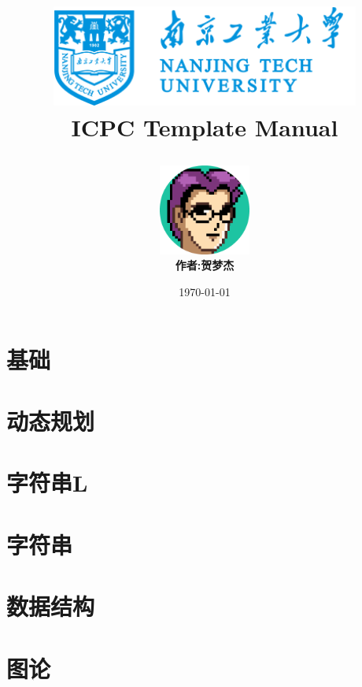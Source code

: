 \documentclass[10pt,a4paper,oneside]{book}
\title{
    \begin{center}
        \includegraphics[width=4in]{logo.png}
        \\ 
        \textbf{ICPC Template Manual}
    \end{center}
}
\author{
    \includegraphics[width=3cm]{author.png}
    \\
    \textbf{作者:贺梦杰}
}
\date{\today}
\begin{document}
    \maketitle
    \tableofcontents

    \chapter{基础}
    


    \chapter{动态规划}
    
    
    
    
    
    

    \chapter{字符串L}
    
    

    \chapter{字符串}
    
    
    


    \chapter{数据结构}
    
    
    
    
    
    
    
    
    
    

    \chapter{图论}
    
    
    
    
    
    
    
    
    
    
\end{document}
